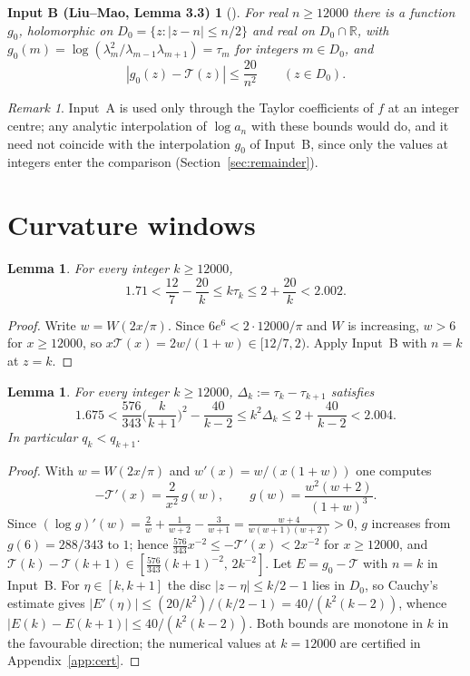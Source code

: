 \documentclass[11pt,a4paper]{article}
\numberwithin{equation}{section}
\newtheorem{lemma}[theorem]{Lemma}
\newtheorem*{inputB}{Input B (Liu--Mao, Lemma 3.3)}
\theoremstyle{definition}
\theoremstyle{remark}
\newtheorem{remark}[theorem]{Remark}
\newcommand{\cT}{\mathcal T}
\begin{document}
\begin{inputB}[{\cite[Lemma~3.3, (3.53)]{LM}}]
For real $n\ge12000$ there is a function $g_0$, holomorphic on $D_0=\{z:|z-n|\le n/2\}$ and real on
$D_0\cap\mathbb R$, with $g_0(m)=\log(\lambda_m^2/\lambda_{m-1}\lambda_{m+1})=\tau_m$ for integers $m\in D_0$, and
\[
|g_0(z)-\cT(z)|\le\frac{20}{n^2}\qquad(z\in D_0).
\]
\end{inputB}

\begin{remark}
Input~A is used only through the Taylor coefficients of $f$ at an integer centre; any analytic interpolation of
$\log a_n$ with these bounds would do, and it need not coincide with the interpolation $g_0$ of Input~B, since
only the values at integers enter the comparison (Section~\ref{sec:remainder}).
\end{remark}

\section{Curvature windows}\label{sec:windows}

\begin{lemma}\label{lem:tau}
For every integer $k\ge12000$,
\[
1.71<\frac{12}{7}-\frac{20}{k}\le k\tau_k\le 2+\frac{20}{k}<2.002 .
\]
\end{lemma}

\begin{proof}
Write $w=W(2x/\pi)$. Since $6e^6<2\cdot12000/\pi$ and $W$ is increasing, $w>6$ for $x\ge12000$, so
$x\cT(x)=2w/(1+w)\in[12/7,2)$. Apply Input~B with $n=k$ at $z=k$.
\end{proof}

\begin{lemma}\label{lem:Delta}
For every integer $k\ge12000$, $\Delta_k:=\tau_k-\tau_{k+1}$ satisfies
\[
1.675<\frac{576}{343}\Big(\frac{k}{k+1}\Big)^2-\frac{40}{k-2}\le k^2\Delta_k\le 2+\frac{40}{k-2}<2.004 .
\]
In particular $q_k<q_{k+1}$.
\end{lemma}

\begin{proof}
With $w=W(2x/\pi)$ and $w'(x)=w/(x(1+w))$ one computes
\[
-\cT'(x)=\frac{2}{x^2}\,g(w),\qquad g(w)=\frac{w^2(w+2)}{(1+w)^3}.
\]
Since $(\log g)'(w)=\frac2w+\frac1{w+2}-\frac3{w+1}=\frac{w+4}{w(w+1)(w+2)}>0$, $g$ increases from
$g(6)=288/343$ to $1$; hence $\frac{576}{343}x^{-2}\le-\cT'(x)<2x^{-2}$ for $x\ge12000$, and
$\cT(k)-\cT(k+1)\in[\frac{576}{343}(k+1)^{-2},\,2k^{-2}]$.
Let $E=g_0-\cT$ with $n=k$ in Input~B. For $\eta\in[k,k+1]$ the disc $|z-\eta|\le k/2-1$ lies in $D_0$, so
Cauchy's estimate gives $|E'(\eta)|\le(20/k^2)/(k/2-1)=40/(k^2(k-2))$, whence
$|E(k)-E(k+1)|\le40/(k^2(k-2))$. Both bounds are monotone in $k$ in the favourable direction; the numerical
values at $k=12000$ are certified in Appendix~\ref{app:cert}.
\end{proof}
\end{document}
